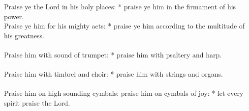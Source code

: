\begin{Parallel}[v]{\colw}{\colx}
{}
{\vern
{\noindent
Praise ye the Lord in his holy places: * praise ye him in the firmament of his power.\\
Praise ye him for his mighty acts: * praise ye him according to the multitude of his greatness.\\ \\
Praise him with sound of trumpet: * praise him with psaltery and harp.\\ \\
Praise him with timbrel and choir: * praise him with strings and organs.\\ \\
Praise him on high sounding cymbals: praise him on cymbals of joy: * let every spirit praise the Lord.}}

\end{Parallel}



